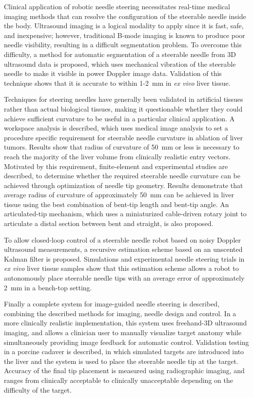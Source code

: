 \documentclass[12pt,twoside]{report}
\begin{document}
Clinical application of robotic needle steering necessitates real-time medical imaging methods that can resolve the configuration of the steerable needle inside the body. Ultrasound imaging is a logical modality to apply since it is fast, safe, and inexpensive; however, traditional B-mode imaging is known to produce poor needle visibility, resulting in a difficult segmentation problem. To overcome this difficulty, a method for automatic segmentation of a steerable needle from 3D ultrasound data is proposed, which uses mechanical vibration of the steerable needle to make it visible in power Doppler image data. Validation of this technique shows that it is accurate to within 1-2~mm in \textit{ex vivo} liver tissue.

Techniques for steering needles have generally been validated in artificial tissues rather than actual biological tissues, making it questionable whether they could achieve sufficient curvature to be useful in a particular clinical application. A workspace analysis is described, which uses medical image analysis to set a procedure specific requirement for steerable needle curvature in ablation of liver tumors. Results show that radius of curvature of 50~mm or less is necessary to reach the majority of the liver volume from clinically realistic entry vectors. Motivated by this requirement, finite-element and experimental studies are described, to determine whether the required steerable needle curvature can be achieved through optimization of needle tip geometry. Results demonstrate that average radius of curvature of approximately 50~mm can be achieved in liver tissue using the best combination of bent-tip length and bent-tip angle. An articulated-tip mechanism, which uses a miniaturized cable-driven rotary joint to articulate a distal section between bent and straight, is also proposed.

To allow closed-loop control of a steerable needle robot based on noisy Doppler ultrasound measurements, a recursive estimation scheme based on an unscented Kalman filter is proposed. Simulations and experimental needle steering trials in \textit{ex vivo} liver tissue samples show that this estimation scheme allows a robot to autonomously place steerable needle tips with an average error of approximately 2~mm in a bench-top setting.

Finally a complete system for image-guided needle steering is described, combining the described methods for imaging, needle design and control. In a more clinically realistic implementation, this system uses freehand-3D ultrasound imaging, and allows a clinician user to manually visualize target anatomy while simultaneously providing image feedback for automatic control. Validation testing in a porcine cadaver is described, in which simulated targets are introduced into the liver and the system is used to place the steerable needle tip at the target. Accuracy of the final tip placement is measured using radiographic imaging, and ranges from clinically acceptable to clinically unacceptable depending on the difficulty of the target. 
\end{document}
